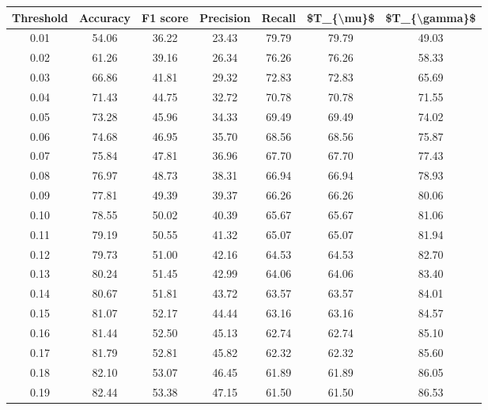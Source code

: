 \begin{tabular}{|c|c|c|c|c|c|c|}
\toprule
 Threshold &  Accuracy &  F1 score &  Precision &  Recall &  \$T\_\{\textbackslash mu\}\$ &  \$T\_\{\textbackslash gamma\}\$ \\
\hline
      0.01 &     54.06 &     36.22 &      23.43 &   79.79 &      79.79 &         49.03 \\
      0.02 &     61.26 &     39.16 &      26.34 &   76.26 &      76.26 &         58.33 \\
      0.03 &     66.86 &     41.81 &      29.32 &   72.83 &      72.83 &         65.69 \\
      0.04 &     71.43 &     44.75 &      32.72 &   70.78 &      70.78 &         71.55 \\
      0.05 &     73.28 &     45.96 &      34.33 &   69.49 &      69.49 &         74.02 \\
      0.06 &     74.68 &     46.95 &      35.70 &   68.56 &      68.56 &         75.87 \\
      0.07 &     75.84 &     47.81 &      36.96 &   67.70 &      67.70 &         77.43 \\
      0.08 &     76.97 &     48.73 &      38.31 &   66.94 &      66.94 &         78.93 \\
      0.09 &     77.81 &     49.39 &      39.37 &   66.26 &      66.26 &         80.06 \\
      0.10 &     78.55 &     50.02 &      40.39 &   65.67 &      65.67 &         81.06 \\
      0.11 &     79.19 &     50.55 &      41.32 &   65.07 &      65.07 &         81.94 \\
      0.12 &     79.73 &     51.00 &      42.16 &   64.53 &      64.53 &         82.70 \\
      0.13 &     80.24 &     51.45 &      42.99 &   64.06 &      64.06 &         83.40 \\
      0.14 &     80.67 &     51.81 &      43.72 &   63.57 &      63.57 &         84.01 \\
      0.15 &     81.07 &     52.17 &      44.44 &   63.16 &      63.16 &         84.57 \\
      0.16 &     81.44 &     52.50 &      45.13 &   62.74 &      62.74 &         85.10 \\
      0.17 &     81.79 &     52.81 &      45.82 &   62.32 &      62.32 &         85.60 \\
      0.18 &     82.10 &     53.07 &      46.45 &   61.89 &      61.89 &         86.05 \\
      0.19 &     82.44 &     53.38 &      47.15 &   61.50 &      61.50 &         86.53 \\

\end{tabular}
